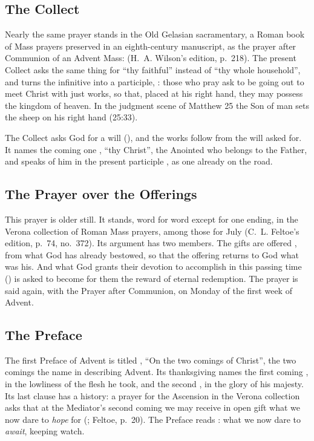 \subsection{The Collect}

Nearly the same prayer stands in the Old Gelasian sacramentary, a Roman
book of Mass prayers preserved in an eighth-century manuscript, as the prayer
after Communion of an Advent Mass:  (H.~A.
Wilson's edition, p.~218). The present Collect asks the same thing for ``thy
faithful'' instead of ``thy whole household'', and turns the infinitive into a
participle, : those who pray ask to be going out to meet
Christ with just works, so that, placed at his right hand, they may possess
the kingdom of heaven. In the judgment scene of Matthew 25 the Son of man
sets the sheep on his right hand (25:33).

The Collect asks God for a will (), and the works follow
from the will asked for. It names the coming one , ``thy
Christ'', the Anointed who belongs to the Father, and speaks of him in the
present participle , as one already on the road.

\subsection{The Prayer over the Offerings}

This prayer is older still. It stands, word for word except for one ending,
in the Verona collection of Roman Mass prayers, among those for July (C.~L.
Feltoe's edition, p.~74, no.~372). Its argument has two members. The gifts
are offered , from what God has
already bestowed, so that the offering returns to God what was his. And what
God grants their devotion to accomplish in this passing time
() is asked to become for them the reward of eternal
redemption. The prayer is said again, with the Prayer after Communion, on
Monday of the first week of Advent.

\subsection{The Preface}

The first Preface of Advent is titled , ``On
the two comings of Christ'', the two comings the  name
in describing Advent. Its thanksgiving names the first coming
, in the lowliness of the flesh he took,
and the second , in the glory of his
majesty. Its last clause has a history: a prayer for the Ascension in the
Verona collection asks that at the Mediator's second coming we may receive in
open gift what we now dare to \emph{hope} for (; Feltoe, p.~20). The Preface reads : what we now dare to \emph{await}, keeping
watch.

